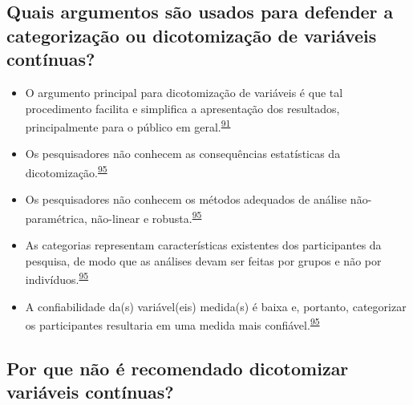 \documentclass[
  a4paper,
]{book}
\begin{document}
\hypertarget{quais-argumentos-suxe3o-usados-para-defender-a-categorizauxe7uxe3o-ou-dicotomizauxe7uxe3o-de-variuxe1veis-contuxednuas}{%
\subsection{Quais argumentos são usados para defender a categorização ou dicotomização de variáveis contínuas?}\label{quais-argumentos-suxe3o-usados-para-defender-a-categorizauxe7uxe3o-ou-dicotomizauxe7uxe3o-de-variuxe1veis-contuxednuas}}

\begin{itemize}
\item
  O argumento principal para dicotomização de variáveis é que tal procedimento facilita e simplifica a apresentação dos resultados, principalmente para o público em geral.\textsuperscript{\protect\hyperlink{ref-Fedorov2009}{91}}
\item
  Os pesquisadores não conhecem as consequências estatísticas da dicotomização.\textsuperscript{\protect\hyperlink{ref-MacCallum2002}{95}}
\item
  Os pesquisadores não conhecem os métodos adequados de análise não-paramétrica, não-linear e robusta.\textsuperscript{\protect\hyperlink{ref-MacCallum2002}{95}}
\item
  As categorias representam características existentes dos participantes da pesquisa, de modo que as análises devam ser feitas por grupos e não por indivíduos.\textsuperscript{\protect\hyperlink{ref-MacCallum2002}{95}}
\item
  A confiabilidade da(s) variável(eis) medida(s) é baixa e, portanto, categorizar os participantes resultaria em uma medida mais confiável.\textsuperscript{\protect\hyperlink{ref-MacCallum2002}{95}}
\end{itemize}

\hypertarget{por-que-nuxe3o-uxe9-recomendado-dicotomizar-variuxe1veis-contuxednuas}{%
\subsection{Por que não é recomendado dicotomizar variáveis contínuas?}\label{por-que-nuxe3o-uxe9-recomendado-dicotomizar-variuxe1veis-contuxednuas}}
\end{document}
